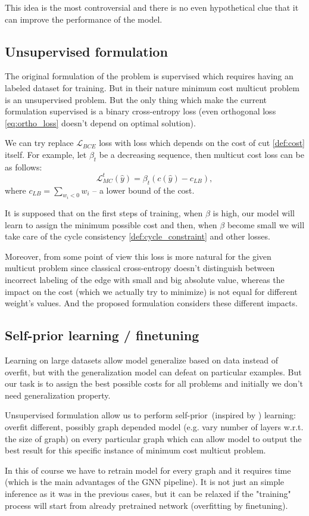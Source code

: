\documentclass[10pt, twocolumn, a4paper]{article}
\theoremstyle{definition}
\begin{document}
This idea is the most controversial and there is no even hypothetical clue that it can improve
the performance of the model.

\subsection{Unsupervised formulation}
The original formulation of the problem is supervised which requires having
an labeled dataset for training. But in their nature minimum cost multicut problem is an
unsupervised problem. But the only thing which make the current formulation supervised is
a binary cross-entropy loss (even orthogonal loss \eqref{eq:ortho_loss} doesn't depend on optimal solution).

We can try replace $\mathcal{L}_{BCE}$ loss with
loss which depends on the cost of cut \eqref{def:cost} itself. For example, let $\beta_t$ be
a decreasing sequence, then multicut cost loss can be as follows:
\[
    \mathcal{L}_{MC}^{t} (\hat{y}) = \beta_t \left( c(\hat{y}) - c_{LB} \right),
\]
where $c_{LB} = \sum\limits_{w_i < 0} w_i$ -- a lower bound of the cost.

It is supposed that on the first steps of training, when $\beta$ is high, our model will learn to
assign the minimum possible cost and then, when $\beta$ become small we will take care of the cycle
consistency \eqref{def:cycle_constraint} and other losses.

Moreover, from some point of view this loss is more natural for the given multicut problem since
classical cross-entropy doesn't distinguish between incorrect labeling of the edge with
small and big absolute value, whereas the impact on the cost (which we actually try to minimize)
is not equal for different weight's values. And the proposed formulation considers these different impacts.

\subsection{Self-prior learning / finetuning}
Learning on large datasets allow model generalize
based on data instead of overfit,
but with the generalization model can defeat on particular examples.
But our task is to assign the best possible costs for all problems and
initially we don't need generalization property.

Unsupervised formulation allow us to perform self-prior~(inspired by \citet{Hanocka2020p2m})
learning: overfit different, possibly graph depended model (e.g. vary
number of layers w.r.t. the size of graph) on every particular graph which
can allow model to output the best result for this specific instance of minimum cost multicut problem.

In this of course we have to retrain model for every
graph and it requires time (which is the main advantages of the GNN pipeline).
It is not just an simple inference as it was in the previous cases, but it can be
relaxed if the "training" process will start from already pretrained
network (overfitting by finetuning).



\end{document}
